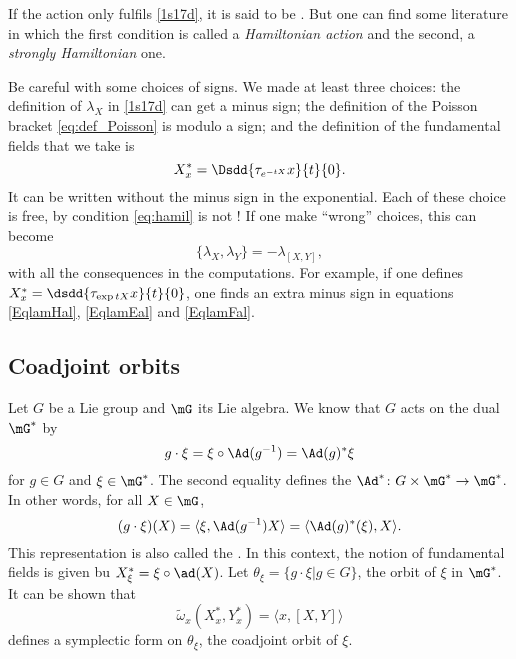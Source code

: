  \begin{remark}
 If the action only fulfils \eqref{1s17d}, it is said to be . But one can find some literature in which the first condition is called a \emph{Hamiltonian action} and the second, a \emph{strongly Hamiltonian} one.
 \end{remark}
 
\begin{remark}
Be careful with some choices of signs. We made at least three choices: the definition of $\lambda_X$ in \eqref{1s17d} can get a minus sign; the definition of the Poisson bracket \eqref{eq:def_Poisson} is modulo a sign; and the definition of the fundamental fields that we take is
 \begin{equation}   \label{EqDefFondsiTHZ}
  X^*_{x}=\Dsdd{ \tau_{ e^{-tX}}x }{t}{0}.
\end{equation} 
 It can be written without the minus sign in the exponential. Each of these choice is free, by condition \eqref{eq:hamil} is not ! If one make  ``wrong'' choices, this can become
\begin{equation}
   \{\lambda_X,\lambda_Y\}=-\lambda_{[X,Y]},
\end{equation}
with all the consequences in the computations. For example, if one defines $X^*_x=\dsdd{\tau_{\exp tX}x}{t}{0}$, one finds an extra minus sign in equations \eqref{EqlamHal}, \eqref{EqlamEal} and \eqref{EqlamFal}.
\end{remark}

\subsection{Coadjoint orbits}		\label{sub:coadjoint}

Let $G$ be a Lie group and $\mG$ its Lie algebra.  We know that $G$ acts on the dual $\mG^*$ by
\begin{equation}    \label{EqDefActCoadj}
  g\cdot \xi=\xi\circ \Ad(g^{-1})=\Ad(g)^*\xi
\end{equation}
for $g\in G$ and $\xi\in\mG^*$. The second equality defines the  $\Ad^*\colon G\times\mG^*\to \mG^*$. In other words, for all $X\in\mG$,
\[
(g\cdot \xi)(X)=\langle \xi,\Ad(g^{-1})X\rangle=\langle \Ad(g)^*(\xi),X\rangle.
\]
This representation is also called the .
In this context, the notion of fundamental fields is given bu $X^*_{\xi}=\xi\circ\ad(X)$. Let $\theta_{\xi}=\{g\cdot \xi|g\in G\}$, the orbit of $\xi$ in $\mG^*$. It can be shown that 
\begin{equation}\label{eq_omega_Gs}
  \tilde\omega_x(X^*_x,Y^*_x)=\langle x,[X,Y]\rangle
\end{equation}
 defines a symplectic form on $\theta_{\xi}$, the coadjoint orbit of $\xi$.

